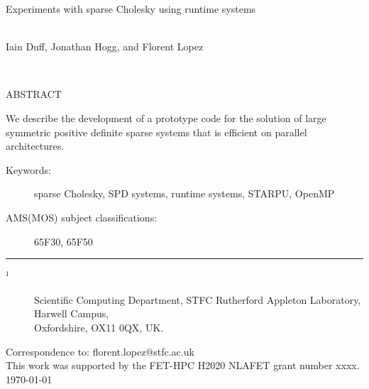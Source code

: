 \documentclass{article}
\newcommand{\stfccovertitle}
{Experiments with sparse Cholesky using runtime systems}
\newcommand{\theabstract}{We describe the development of a prototype code for 
the solution of large symmetric positive definite sparse systems that is
efficient on parallel architectures.
}
\begin{document}
\begin{titlepage}

\vspace*{-0.5cm}

\vspace{1.0 cm}

{\Large \bf
\begin{center}
   \stfccovertitle
\end{center}}

\begin{center}
\mbox{} \\
      Iain Duff\footnotemark[1], 
      Jonathan Hogg\footnotemark[1], and Florent Lopez\footnotemark[1]
     
\mbox{} \\
\end{center}

\vspace{1.0cm}


\noindent
{\large ABSTRACT}

\vspace{0.3cm}
\noindent
\theabstract

\vspace{0.6cm}

\begin{description}
\item [Keywords:] sparse Cholesky, SPD systems, runtime systems, STARPU, OpenMP
\item [AMS(MOS) subject classifications:]  65F30, 65F50
\end{description}

\vspace{0.1 cm}

\noindent \rule{15cm}{0.001in}
\vspace{0.1 cm}

\begin{description}

\item [$^1$] Scientific Computing Department, STFC Rutherford 
Appleton Laboratory,
Harwell Campus,\\ Oxfordshire, OX11 0QX, UK.
\end{description}
\noindent
Correspondence to: florent.lopez@stfc.ac.uk\\
This work was supported by the FET-HPC H2020 NLAFET grant number xxxx.\\


\vspace{1.1 cm}
\noindent \today

\end{titlepage}
\end{document}
